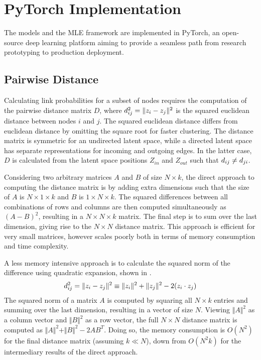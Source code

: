 \section{PyTorch Implementation}

The models and the MLE framework are implemented in PyTorch, an open-source deep learning platform aiming to provide a seamless path from research prototyping to production deployment. %

\subsection{Pairwise Distance}

    Calculating link probabilities for a subset of nodes requires the computation of the pairwise distance matrix $D$, where $\sub(d)^2=\Vert z_i-z_j\Vert^2$ is the squared euclidean distance between nodes $i$ and $j$. The squared euclidean distance differs from euclidean distance by omitting the square root for faster clustering. The distance matrix is symmetric for an undirected latent space, while a directed latent space has separate representations for incoming and outgoing edges. In the latter case, $D$ is calculated from the latent space positions $Z_{in}$ and $Z_{out}$ such that $\sub(d)\neq\sub(d)(ji)$.
    
    Considering two arbitrary matrices $A$ and $B$ of size $N\times k$, the direct approach to computing the distance matrix is by adding extra dimensions such that the size of $A$ is $N\times 1\times k$ and $B$ is $1\times N\times k$. The squared differences between all combinations of rows and columns are then computed simultaneously as $(A-B)^2$, resulting in a $N\times N\times k$ matrix. The final step is to sum over the last dimension, giving rise to the $N\times N$ distance matrix. This approach is efficient for very small matrices, however scales poorly both in terms of memory consumption and time complexity.
    
    A less memory intensive approach is to calculate the squared norm of the difference using quadratic expansion, shown in .
    \begin{equation}\label{eq:pyimpl-dist-quadratic}
        \sub(d)^2=\Vert z_i-z_j\Vert^2\equiv\Vert z_i\Vert^2 + \Vert z_j\Vert^2 - 2(z_i\cdot z_j)
    \end{equation}
    The squared norm of a matrix $A$ is computed by squaring all $N\times k$ entries and summing over the last dimension, resulting in a vector of size $N$. Viewing $\Vert A\Vert^2$ as a column vector and $\Vert B\Vert^2$ as a row vector, the full $N\times N$ distance matrix is computed as $\Vert A\Vert^2 + \Vert B\Vert^2 - 2AB^T$. Doing so, the memory consumption is $O(N^2)$ for the final distance matrix (assuming $k\ll N$), down from $O(N^2k)$ for the intermediary results of the direct approach.
    
